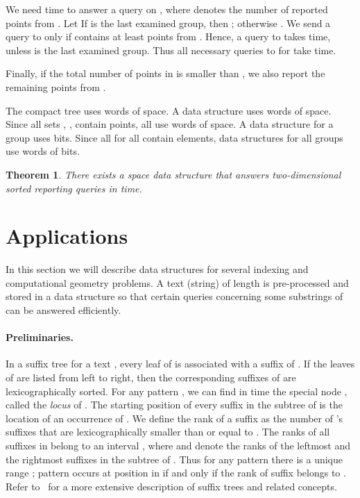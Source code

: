 \documentclass[11pt]{article}
\newtheorem{theorem}{Theorem}
\begin{document}
We need  time to answer a query on , where 
 denotes the number of reported points from .  
Let 
If  is the last examined group, then ; otherwise 
.
We send a query to  only if  contains at least 
 points from  . 
Hence,  a query to  takes  time, 
unless  is the last examined group. 
Thus all necessary queries to  for  take  time.

Finally, if the total number of points in  is smaller than , we also report the remaining points from . 

The compact tree  uses  words of space.  
A data structure  uses  words 
of space. Since all sets , , contain  
points, all  use  words of space.  
A data structure for a group   uses 
 bits. Since all  for all  contain  elements, data structures for all groups  use  
words of  bits. 
\begin{theorem}\label{theor:2dim}
  There exists a  space data structure that answers
  two-dimensional sorted reporting queries in  time.
\end{theorem}

\section{Applications}
\label{sec:appl}
In this section we will describe data structures for several indexing
 and computational geometry problems. A text (string)  of length  
 is pre-processed and stored in a data structure so that 
certain queries concerning some substrings of  can be answered 
efficiently.
\paragraph{Preliminaries.}
In a suffix tree  for a text , every leaf of  is associated with a suffix of 
. If the leaves of  are listed from left to right, then the 
corresponding suffixes of  are lexicographically sorted. 
For any pattern , we can find in  time the special 
node , called the \emph{locus} of . 
The starting position of every suffix in the subtree of  is the 
location of an occurrence of . 
We define the rank of a suffix  as the number of 's suffixes 
that are lexicographically smaller than or equal to .  
The ranks of all suffixes in  belong to an interval 
, where  and  denote the ranks 
of the leftmost and the rightmost suffixes in the subtree of . 
Thus for any pattern  there is a unique range ; 
pattern  occurs at position  in  if and only if 
the rank of suffix  belongs to .  
Refer to~\cite{Gusfield1997} for a more extensive description of
suffix trees and related concepts. 
\end{document}
